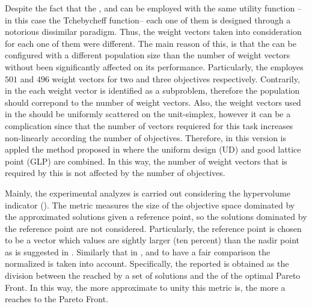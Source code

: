 Despite the fact that the \MOEAD{}, and \RMOEA{} can be employed with the same utility function --in this case the Tchebycheff function-- each one of them is designed through a notorious dissimilar paradigm.
%
Thus, the weight vectors taken into consideration for each one of them were different.
%
The main reason of this, is that the \RMOEA{} can be configured with a different population size than the number of weight vectors without been significantly affected on its performance.
%
Particularly, the \RMOEA{} employes $501$ and $496$ weight vectors for two and three objectives respectively.
%
Contrarily, in the \MOEAD{} each weight vector is identified as a subproblem, therefore the population should correpond to the number of weight vectors.
%
Also, the weight vectors used in the \MOEAD{} should be uniformly scattered on the unit-simplex, however it can be a complication since that the number of vectors requiered for this task increases non-linearly according the number of objectives.
%
Therefore, in this version is appled the method proposed in \cite{Joel:MOEAD_Uniform_Design, Joel:Kuhn_Munkres} where the uniform design (UD) \cite{Joel:Uniform_Design} and good lattice point (GLP) are combined.
%
In this way, the number of weight vectors that is required by this \MOEA{} is not affected by the number of objectives.


Mainly, the experimental analyzes is carried out considering the hypervolume indicator (\HV{}).
%
The \HV{} metric measures the size of the objective space dominated by the approximated solutions given a reference point, so the solutions dominated by the reference point are not considered.
%
Particularly, the reference point is chosen to be a vector which values are sightly larger (ten percent) than the nadir point as is suggested in \cite{ishibuchi2017reference}.
%
Similarly that in \cite{li2015evolutionary}, and to have a fair comparison the normalized \HV{} is taken into account.
%
Specifically, the \HV{} reported is obtained as the division between the \HV{} reached by a set of solutions and the \HV{} of the optimal Pareto Front.
%
In this way, the more approximate to unity this metric is, the more a \MOEA{} reaches to the Pareto Front.
%



